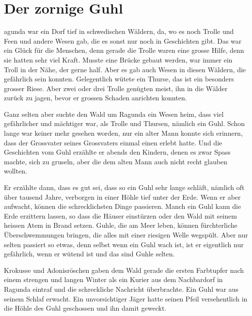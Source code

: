 \chapter*{\FontO Der zornige Guhl}
\begin{swb}
 agunda war ein Dorf tief in schwedischen Wäldern, da, wo es noch Trolle und Feen und andere Wesen gab, die es sonst nur noch in Geschichten gibt. Das war ein Glück für die Menschen, denn gerade die Trolle waren eine grosse Hilfe, denn sie hatten sehr viel Kraft. Musste eine Brücke gebaut werden, war immer ein Troll in der Nähe, der gerne half. Aber es gab auch Wesen in diesen Wäldern, die gefährlich sein konnten. Gelegentlich wütete ein Thurse, das ist ein besonders grosser Riese. Aber zwei oder drei Trolle genügten meist, ihn in die Wälder zurück zu jagen, bevor er grossen Schaden anrichten konnten. 

Ganz selten aber suchte den Wald um Ragunda ein Wesen heim, dass viel gefährlicher und mächtiger war, als Trolle und Thursen, nämlich ein Guhl. Schon lange war keiner mehr gesehen worden, nur ein alter Mann konnte sich erinnern, dass der Grossvater seines Grossvaters einmal einen erlebt hatte. Und die Geschichten vom Guhl erzählte er abends den Kindern, denen es zwar Spass machte, sich zu gruseln, aber die dem alten Mann auch nicht recht glauben wollten. 

Er erzählte dann, dass es gut sei, dass so ein Guhl sehr lange schläft, nämlich
oft über tausend Jahre, verborgen in einer Höhle tief unter der Erde. Wenn er
aber aufwacht, können die schrecklichsten Dinge passieren. Manch ein Guhl kann
die Erde erzittern lassen, so dass die Häuser einstürzen oder den Wald mit
seinem heissen Atem in Brand setzen. Guhle, die am Meer leben, können fürchterliche Überschwemmungen bringen, die alles mit einer riesigen Welle wegspült. Aber nur selten passiert so etwas, denn selbst wenn ein Guhl wach ist, ist er eigentlich nur gefährlich, wenn er wütend ist und das sind Guhle selten.

Krokusse und Adonisröschen gaben dem Wald gerade die ersten Farbtupfer nach einem strengen  und langen Winter als ein Kurier aus dem Nachbardorf in Ragunda eintraf und die schreckliche Nachricht überbrachte. Ein Guhl war aus seinem Schlaf erwacht. Ein unvorsichtiger Jäger hatte seinen Pfeil versehentlich in die Höhle des Guhl geschossen und ihn damit geweckt.



\end{swb}
